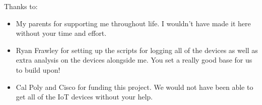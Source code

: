 \noindent
Thanks to:
\begin{itemize}
    \item My parents for supporting me throughout life. I wouldn't have made it here without your time and effort.
    \item Ryan Frawley for setting up the scripts for logging all of the devices as well as extra analysis on the devices alongside me. You set a really good base for us to build upon!
    \item Cal Poly and Cisco for funding this project. We would not have been able to get all of the IoT devices without your help.
\end{itemize}
